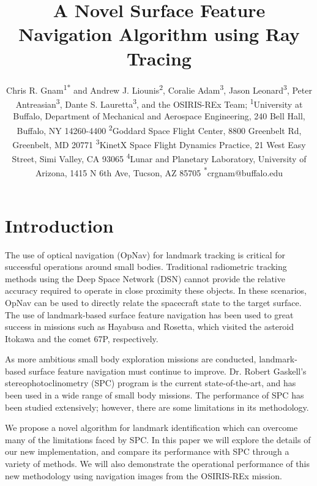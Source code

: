 \documentclass{RPI-SIW}
\author{
	Chris R. Gnam\textsuperscript{1}\textsuperscript{*}
	and 
	Andrew J. Liounis\textsuperscript{2},
    Coralie Adam\textsuperscript{3},
    Jason Leonard\textsuperscript{3},
    Peter Antreasian\textsuperscript{3},
    Dante S. Lauretta\textsuperscript{3},
    and the OSIRIS-REx Team;
	\textsuperscript{1}University at Buffalo, Department of Mechanical and Aerospace Engineering, 240 Bell Hall, Buffalo, NY  14260-4400
	\textsuperscript{2}Goddard Space Flight Center, 8800 Greenbelt Rd, Greenbelt, MD 20771
    \textsuperscript{3}KinetX Space Flight Dynamics Practice, 21 West Easy Street, Simi Valley, CA 93065
    \textsuperscript{4}Lunar and Planetary Laboratory, University of Arizona, 1415 N 6th Ave, Tucson, AZ 85705
	\textsuperscript{*}crgnam@buffalo.edu
}
\title{A Novel Surface Feature Navigation Algorithm using Ray Tracing}
\begin{document}
\maketitle


\section*{Introduction}
The use of optical navigation (OpNav) for landmark tracking is critical for successful operations around small bodies.  Traditional radiometric tracking methods using the Deep Space Network (DSN) cannot provide the relative accuracy required to operate in close proximity these objects.  In these scenarios, OpNav can be used to directly relate the spacecraft state to the target surface.  The use of landmark-based surface feature navigation has been used to great success in missions such as Hayabusa\cite{hayabusa} and Rosetta\cite{rosetta}, which visited the asteroid Itokawa and the comet 67P, respectively.

As more ambitious small body exploration missions are conducted, landmark-based surface feature navigation must continue to improve.  Dr. Robert Gaskell's stereophotoclinometry (SPC) program is the current state-of-the-art, and has been used in a wide range of small body missions.  The performance of SPC has been studied extensively\cite{spc_sensitiviy}; however, there are some limitations in its methodology.

We propose a novel algorithm for landmark identification which can overcome many of the limitations faced by SPC.  In this paper we will explore the details of our new implementation, and compare its performance with SPC through a variety of methods.  We will also demonstrate the operational performance of this new methodology using navigation images from the OSIRIS-REx mission.
\end{document}
